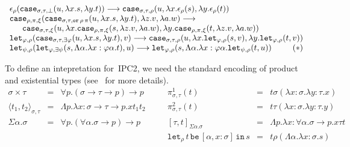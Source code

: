 \documentclass[a4paper,UKenglish,cleveref,autoref,numberwithinsect]{lipics-v2019}
\theoremstyle{definition}
\newcommand{\arrtype}{\rightarrow}
\newcommand{\abs}[2]{\lambda #1.#2}
\newcommand{\tabs}[2]{\Lambda #1.#2}
\newcommand{\pair}[2]{\langle #1,#2 \rangle}
\newcommand{\expair}[2]{[#1,#2]}
\newcommand{\red}{\longrightarrow}
\newcommand{\xlet}[4]{\mathtt{let}_{#1}\,#2\,\mathtt{be}\,[#3]\,\mathtt{in}\,#4}
\begin{document}
\[
\begin{array}{l}
\epsilon_\rho(\mathtt{case}_{\sigma,\tau,\bot}(u,\abs{x}{s},
  \abs{y}{t})) \red
  \mathtt{case}_{\sigma,\tau,\rho}(u,\abs{x}{\epsilon_\rho(s)},
  \abs{y}{\epsilon_\rho(t)}) \\
\mathtt{case}_{\rho,\pi,\xi}(\mathtt{case}_{\sigma,\tau,\mathtt{or}\,
  \rho\,\pi}(u,\abs{x}{s},\abs{y}{t}),\abs{z}{v},
  \abs{a}{w}) \red \\
  \phantom{AB}
  \mathtt{case}_{\sigma,\tau,\xi}(u,\abs{x}{\mathtt{case}_{
  \rho,\pi,\xi}(s,\abs{z}{v},\abs{a}{w})},
  \abs{y}{\mathtt{case}_{\rho,\pi,\xi}(t,\abs{z}{v},
  \abs{a}{w})}) \\
\mathtt{let}_{\varphi,\rho}(
  \mathtt{case}_{\sigma,\tau,\exists\varphi}(
  u,\abs{x}{s},\abs{y}{t}),v) \red
  \mathtt{case}_{\sigma,\tau,\rho}(u,
  \abs{x}{\mathtt{let}_{\varphi,\rho}(s,v)},
  \abs{y}{\mathtt{let}_{\varphi,\rho}(t,v)}) \\
\mathtt{let}_{\psi,\rho}(\mathtt{let}_{\varphi,\exists\psi}(s,
  \tabs{\alpha}{\abs{x:\varphi\alpha}{t}}),u) \red
  \mathtt{let}_{\varphi,\rho}(s,\tabs{\alpha}{\abs{x:
  \varphi\alpha}{\mathtt{let}_{\psi,\rho}(t,u)}})
  \hfill (*) \\
\end{array}
\]

To define an intepretation for~IPC2, we need the standard encoding of
product and existential types (see~\cite[Chapter~11]{Girard1989} for
more details).
  \[
  \begin{array}{rclcrcl}
    \sigma \times \tau &=& \forall p . (\sigma \arrtype \tau \arrtype p) \arrtype p & \quad &
    \pi^1_{\sigma,\tau}(t) &=& t \sigma (\abs{x:\sigma}{\abs{y:\tau}{x}}) \\
    \pair{t_1}{t_2}_{\sigma,\tau} &=& \tabs{p}{\abs{x:\sigma\arrtype\tau\arrtype p}{x t_1 t_2}} & &
    \pi^2_{\sigma,\tau}(t) &=& t \tau (\abs{x:\sigma}{\abs{y:\tau}{y}}) \\
    \Sigma \alpha . \sigma &=& \forall p . (\forall \alpha . \sigma \arrtype p) \arrtype p & \quad &
    \expair{\tau}{t}_{\Sigma\alpha.\sigma} &=& \tabs{p}{\abs{x:\forall\alpha.\sigma\arrtype p}{x \tau t}} \\
    & & & &
    \xlet{\rho}{t}{\alpha,x:\sigma}{s} &=& t \rho (\tabs{\alpha}{\abs{x:\sigma}{s}}) \\
  \end{array}
  \]
\end{document}
